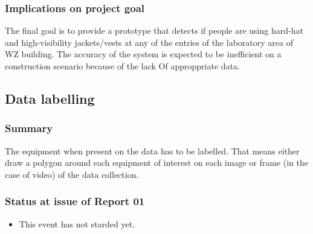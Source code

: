 \documentclass{article}
\begin{document}
\begin{enumerate}

\subsubsection{Implications on project goal}
\label{sec:org090bc74}
The final goal is to provide a prototype that detects if people are using hard-hat and high-visibility jackets/vests at any of the entries of the laboratory area of WZ building.
The accuracy of the system is expected to be inefficient on a construction scenario because of the lack Of approppriate data.
\subsection{Data labelling}
\label{sec:org557463a}
\subsubsection{Summary}
\label{sec:org93fe9aa}
The equipment when present on the data has to be labelled.
That means either draw a polygon around each equipment of interest on each image or frame (in the case of video) of the data collection.
\subsubsection{Status at issue of Report 01}
\label{sec:orga03b70a}
\begin{itemize}
\item This event has not starded yet.
\end{itemize}

\end{enumerate}
\end{document}
